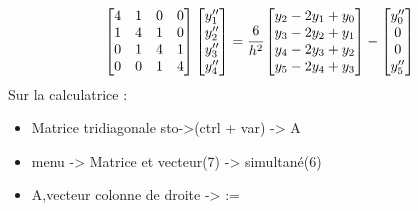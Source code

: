 \[
\begin{bmatrix}
4 & 1 & 0 & 0 \\
1 & 4 & 1 & 0 \\
0 & 1 & 4 & 1 \\
0 & 0 & 1 & 4 \\
\end{bmatrix}
\begin{bmatrix}
y''_1 \\
y''_2 \\
y''_3 \\
y''_4 \\
\end{bmatrix}
=
\cfrac{6}{h^2}
\begin{bmatrix}
y_2 - 2y_1 + y_0 \\
y_3 - 2y_2 + y_1 \\
y_4 - 2y_3 + y_2 \\
y_5 - 2y_4 + y_3 \\
\end{bmatrix}
-
\begin{bmatrix}
y''_0 \\
0 \\
0 \\
y''_5 \\
\end{bmatrix}
\]
Sur la calculatrice : 
\begin{itemize}
    \item Matrice tridiagonale sto->(ctrl + var) -> A
    \item menu -> Matrice et vecteur(7) -> simultané(6)
    \item A,vecteur colonne de droite -> :=
\end{itemize}



